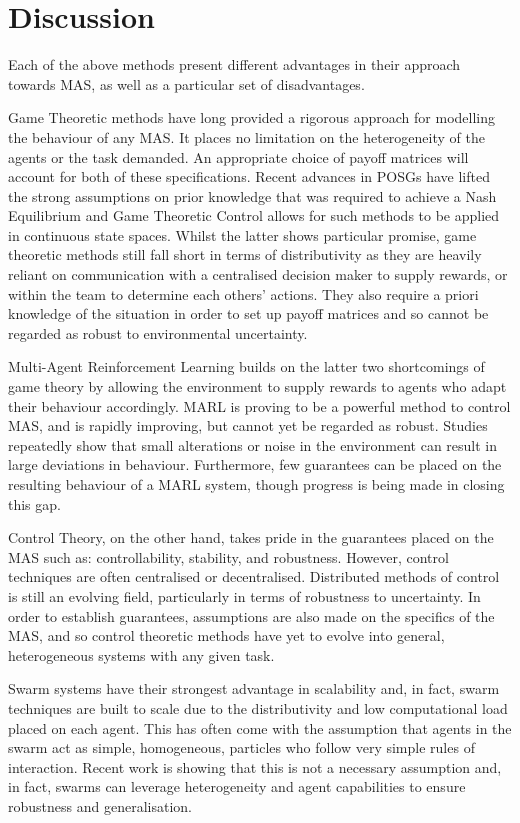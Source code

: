 \documentclass[.../main.tex]{subfiles}
\begin{document}
\section{Discussion} \label{sec:remarks}

Each of the above methods present different advantages in their
approach towards MAS, as well as a particular set of disadvantages.

Game Theoretic methods have long provided a rigorous approach for
modelling the behaviour of any MAS. It places no limitation on the
heterogeneity of the agents or the task demanded. An appropriate
choice of payoff matrices will account for both of these
specifications. Recent advances in POSGs have lifted the strong
assumptions on prior knowledge that was required to achieve a Nash
Equilibrium and Game Theoretic Control allows for such methods to be
applied in continuous state spaces. Whilst the latter shows particular
promise, game theoretic methods still fall short in terms of
distributivity as they are heavily reliant on communication with a
centralised decision maker to supply rewards, or within the team to
determine each others' actions. They also require a priori knowledge
of the situation in order to set up payoff matrices and so cannot be
regarded as robust to environmental uncertainty.

Multi-Agent Reinforcement Learning builds on the latter two
shortcomings of game theory by allowing the environment to supply
rewards to agents who adapt their behaviour accordingly. MARL is
proving to be a powerful method to control MAS, and is rapidly
improving, but cannot yet be regarded as robust. Studies repeatedly
show that small alterations or noise in the environment can result in
large deviations in behaviour. Furthermore, few guarantees can be
placed on the resulting behaviour of a MARL system, though progress is
being made in closing this gap.

Control Theory, on the other hand, takes pride in the guarantees
placed on the MAS such as: controllability, stability, and
robustness. However, control techniques are often centralised or
decentralised. Distributed methods of control is still an evolving
field, particularly in terms of robustness to uncertainty. In order to
establish guarantees, assumptions are also made on the specifics of
the MAS, and so control theoretic methods have yet to evolve into
general, heterogeneous systems with any given task.

Swarm systems have their strongest advantage in scalability and, in
fact, swarm techniques are built to scale due to the distributivity
and low computational load placed on each agent. This has often come
with the assumption that agents in the swarm act as simple,
homogeneous, particles who follow very simple rules of
interaction. Recent work is showing that this is not a necessary
assumption and, in fact, swarms can leverage heterogeneity and agent
capabilities to ensure robustness and generalisation.
\end{document}
